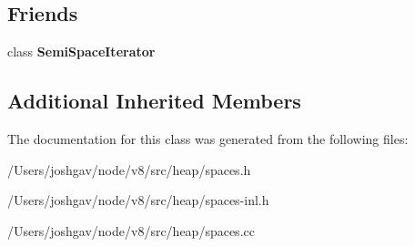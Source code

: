 \subsection*{Friends}
\begin{DoxyCompactItemize}
\item 
class {\bfseries Semi\+Space\+Iterator}\hypertarget{classv8_1_1internal_1_1_new_space_a8b928629934cd4bbb42b079d8d3faf28}{}\label{classv8_1_1internal_1_1_new_space_a8b928629934cd4bbb42b079d8d3faf28}

\end{DoxyCompactItemize}
\subsection*{Additional Inherited Members}


The documentation for this class was generated from the following files\+:\begin{DoxyCompactItemize}
\item 
/\+Users/joshgav/node/v8/src/heap/spaces.\+h\item 
/\+Users/joshgav/node/v8/src/heap/spaces-\/inl.\+h\item 
/\+Users/joshgav/node/v8/src/heap/spaces.\+cc\end{DoxyCompactItemize}

